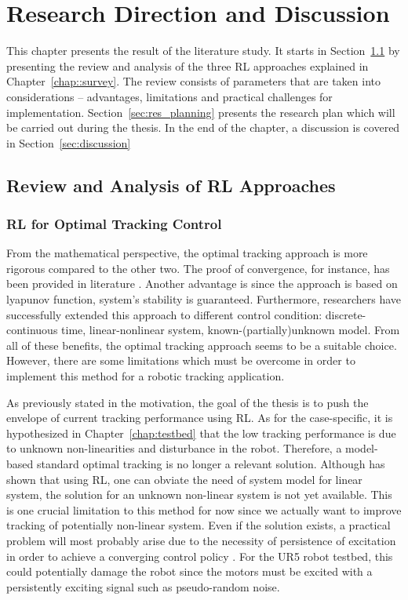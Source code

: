 \chapter{Research Direction and Discussion}

This chapter presents the result of the literature study. It starts in Section~\ref*{sec:review} by presenting the review and analysis of the three \ac {RL} approaches explained in Chapter~\ref{chap::survey}. The review consists of parameters that are taken into considerations -- advantages, limitations and practical challenges for implementation. Section~\ref{sec:res_planning} presents the research plan which will be carried out during the thesis. In the end of the chapter, a discussion is covered in Section~\ref{sec:discussion}
\section{Review and Analysis of \ac{RL} Approaches} \label{sec:review}
\subsection{{\ac{RL} for Optimal Tracking Control}}
From the mathematical perspective, the optimal tracking approach is more rigorous compared to the other two. The proof of convergence, for instance, has been provided in literature \cite{1099755}. Another advantage is since the approach is based on lyapunov function, system's stability is guaranteed. Furthermore, researchers have successfully extended this approach to different control condition: discrete-continuous time, linear-nonlinear system, known-(partially)unknown model. From all of these benefits, the optimal tracking approach seems to be a suitable choice. However, there are some limitations which must be overcome in order to implement this method for a robotic tracking application.

As previously stated in the motivation, the goal of the thesis is to push the envelope of current tracking performance using \ac {RL}. As for the case-specific, it is hypothesized in Chapter~\ref{chap:testbed} that the low tracking performance is due to unknown non-linearities and disturbance in the robot. Therefore, a model-based standard optimal tracking is no longer a relevant solution. Although \cite{Kiumarsi20141167} has shown that using \ac{RL}, one can obviate the need of system model for linear system, the solution for an unknown non-linear system is not yet available. This is one crucial limitation to this method for now since we actually want to improve tracking of potentially non-linear system. Even if the solution exists, a practical problem will most probably arise due to the necessity of persistence of excitation in order to achieve a converging control policy \cite{Kiumarsi20141167} \cite{AlTamimi2007473}. For the UR5 robot testbed, this could potentially damage the robot since the motors must be excited with a persistently exciting signal such as pseudo-random noise. 

